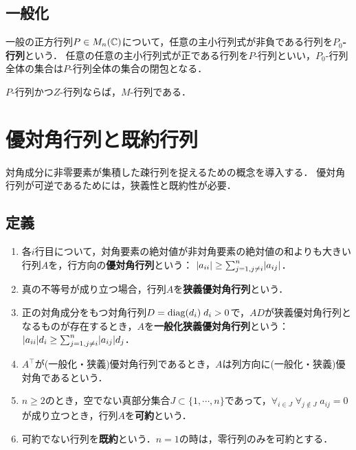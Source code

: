 \documentclass[uplatex, dvipdfmx]{jsreport}
\begin{document}
\subsection{一般化}

\begin{definition}
    一般の正方行列$P\in M_n(\mathbb{C})$について，任意の主小行列式が非負である行列を\textbf{$P_0$-行列}という．
    任意の任意の主小行列式が正である行列を$P$-行列といい，$P_0$-行列全体の集合は$P$-行列全体の集合の閉包となる．
\end{definition}

\begin{lemma}
    $P$-行列かつ$Z$-行列ならば，$M$-行列である．
\end{lemma}

\section{優対角行列と既約行列}

\begin{tcolorbox}[colframe=ForestGreen, colback=ForestGreen!10!white,breakable,colbacktitle=ForestGreen!40!white,coltitle=black,fonttitle=\bfseries\sffamily,
title=]
    対角成分に非零要素が集積した疎行列を捉えるための概念を導入する．
    優対角行列が可逆であるためには，狭義性と既約性が必要．
\end{tcolorbox}

\subsection{定義}

\begin{definition}\mbox{}
    \begin{enumerate}
        \item 各$i$行目について，対角要素の絶対値が非対角要素の絶対値の和よりも大きい行列$A$を，行方向の\textbf{優対角行列}という：
        $\lvert a_{ii}\rvert\ge\sum^n_{j=1,j\ne i}\lvert a_{ij}\rvert$．
        \item 真の不等号が成り立つ場合，行列$A$を\textbf{狭義優対角行列}という．
        \item 正の対角成分をもつ対角行列$D=\mathrm{diag}(d_i)\;d_i>0$で，$AD$が狭義優対角行列となるものが存在するとき，$A$を\textbf{一般化狭義優対角行列}という：$\lvert a_{ii}\rvert d_i\ge\sum^n_{j=1,j\ne i}\lvert a_{ij}\rvert d_j$．
        \item $A^\top$が(一般化・狭義)優対角行列であるとき，$A$は列方向に(一般化・狭義)優対角であるという．
        \item $n\ge 2$のとき，空でない真部分集合$J\subset\{1,\cdots,n\}$であって，$\forall_{i\in J}\;\forall_{j\notin J}\;a_{ij}=0$が成り立つとき，行列$A$を\textbf{可約}という．
        \item 可約でない行列を\textbf{既約}という．$n=1$の時は，零行列のみを可約とする．
    \end{enumerate}
\end{definition}
\end{document}
